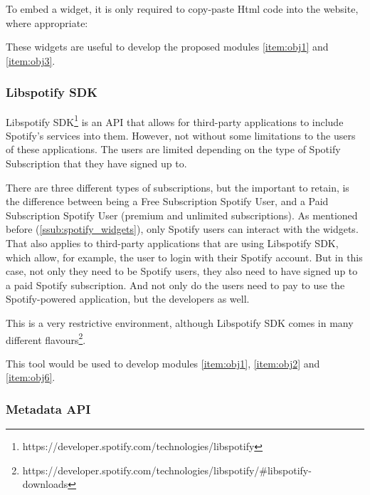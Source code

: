       To embed a widget, it is only required to copy-paste Html code into the website, where appropriate:

      

      These widgets are useful to develop the proposed modules \ref{item:obj1} and \ref{item:obj3}.


    \subsubsection{Libspotify SDK} %
    \label{ssub:libspotify_sdk}

      Libspotify SDK\footnote{https://developer.spotify.com/technologies/libspotify} is an API that allows for third-party applications to include Spotify's services into them.
      However, not without some limitations to the users of these applications.
      The users are limited depending on the type of Spotify Subscription that they have signed up to.

      There are three different types of subscriptions, but the important to retain, is the difference between being a Free Subscription Spotify User, and a Paid Subscription Spotify User (premium and unlimited subscriptions).
      As mentioned before (\ref{ssub:spotify_widgets}), only Spotify users can interact with the widgets.
      That also applies to third-party applications that are using Libspotify SDK, which allow, for example, the user to login with their Spotify account.
      But in this case, not only they need to be Spotify users, they also need to have signed up to a paid Spotify subscription.
      And not only do the users need to pay to use the Spotify-powered application, but the developers as well.

      This is a very restrictive environment, although Libspotify SDK comes in many different flavours\footnote{https://developer.spotify.com/technologies/libspotify/\#libspotify-downloads}.

      This tool would be used to develop modules \ref{item:obj1}, \ref{item:obj2} and \ref{item:obj6}.
      



    \subsubsection{Metadata API} %
    \label{ssub:metadata_api}

